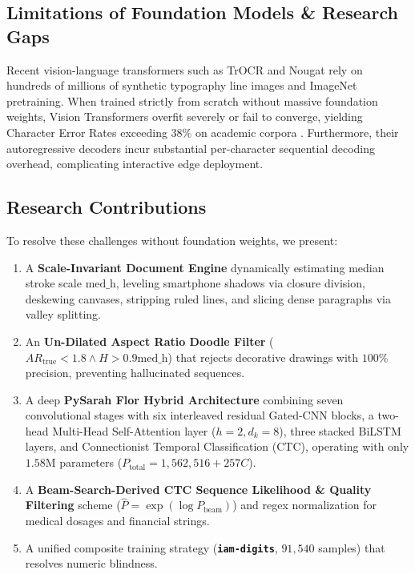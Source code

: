 \documentclass[default,iicol,sn-basic]{sn-jnl}
\begin{document}
{\subsection{Limitations of Foundation Models & Research Gaps}
Recent vision-language transformers such as TrOCR \cite{li2023trocr} and Nougat \cite{blecher2023nougat} rely on hundreds of millions of synthetic typography line images and ImageNet pretraining. When trained strictly from scratch without massive foundation weights, Vision Transformers overfit severely or fail to converge, yielding Character Error Rates exceeding $38\%$ on academic corpora \cite{diaz2022rethinking, kang2023evaluating}. Furthermore, their autoregressive decoders incur substantial per-character sequential decoding overhead, complicating interactive edge deployment.

\subsection{Research Contributions}
To resolve these challenges without foundation weights, we present:
\begin{enumerate}
    \item A \textbf{Scale-Invariant Document Engine} dynamically estimating median stroke scale $\text{med\_h}$, leveling smartphone shadows via closure division, deskewing canvases, stripping ruled lines, and slicing dense paragraphs via valley splitting.
    \item An \textbf{Un-Dilated Aspect Ratio Doodle Filter} ($AR_{\text{true}} < 1.8 \land H > 0.9\text{med\_h}$) that rejects decorative drawings with $100\%$ precision, preventing hallucinated sequences.
    \item A deep \textbf{PySarah Flor Hybrid Architecture} combining seven convolutional stages with six interleaved residual Gated-CNN blocks, a two-head Multi-Head Self-Attention layer ($h=2, d_k=8$), three stacked BiLSTM layers, and Connectionist Temporal Classification (CTC), operating with only $1.58\text{M}$ parameters ($P_{\text{total}} = 1,562,516 + 257C$).
    \item A \textbf{Beam-Search-Derived CTC Sequence Likelihood & Quality Filtering} scheme ($\hat{P} = \exp(\log P_{\text{beam}})$) and regex normalization for medical dosages and financial strings.
    \item A unified composite training strategy (\textbf{\texttt{iam-digits}}, $91,540$ samples) that resolves numeric blindness.
    
\end{enumerate}

}
\end{document}
